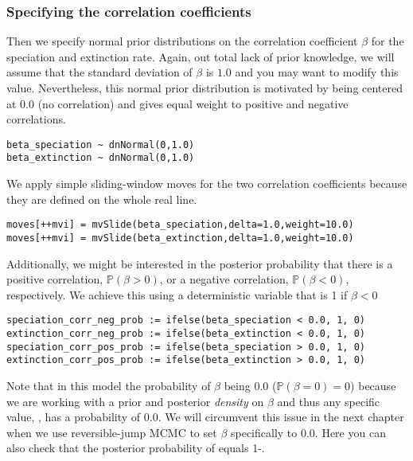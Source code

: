 \subsubsection{Specifying the correlation coefficients}
Then we specify normal prior distributions on the correlation coefficient $\beta$ for the speciation and extinction rate.
Again, out total lack of prior knowledge, we will assume that the standard deviation of $\beta$ is $1.0$ and you may want to modify this value.
Nevertheless, this normal prior distribution is motivated by being centered at 0.0 (no correlation) and gives equal weight to positive and negative correlations.
{\tt \begin{snugshade*}
\begin{lstlisting}
beta_speciation ~ dnNormal(0,1.0)
beta_extinction ~ dnNormal(0,1.0)
\end{lstlisting}
\end{snugshade*}}
We apply simple sliding-window moves for the two correlation coefficients because they are defined on the whole real line.
{\tt \begin{snugshade*}
\begin{lstlisting}
moves[++mvi] = mvSlide(beta_speciation,delta=1.0,weight=10.0)
moves[++mvi] = mvSlide(beta_extinction,delta=1.0,weight=10.0)
\end{lstlisting}
\end{snugshade*}}
Additionally, we might be interested in the posterior probability that there is a positive correlation, $\mathbb{P}(\beta>0)$, or a negative correlation, $\mathbb{P}(\beta<0)$, respectively.
We achieve this using a deterministic variable that is 1 if $\beta<0$
{\tt \begin{snugshade*}
\begin{lstlisting}
speciation_corr_neg_prob := ifelse(beta_speciation < 0.0, 1, 0)
extinction_corr_neg_prob := ifelse(beta_extinction < 0.0, 1, 0)
speciation_corr_pos_prob := ifelse(beta_speciation > 0.0, 1, 0)
extinction_corr_pos_prob := ifelse(beta_extinction > 0.0, 1, 0)
\end{lstlisting}
\end{snugshade*}}
Note that in this model the probability of $\beta$ being 0.0 ($\mathbb{P}(\beta=0)=0$) because we are working with a prior and posterior \emph{density} on $\beta$ and thus any specific value, , has a probability of 0.0.
We will circumvent this issue in the next chapter when we use reversible-jump MCMC to set $\beta$ specifically to 0.0.
Here you can also check that the posterior probability of  equals 1-.

